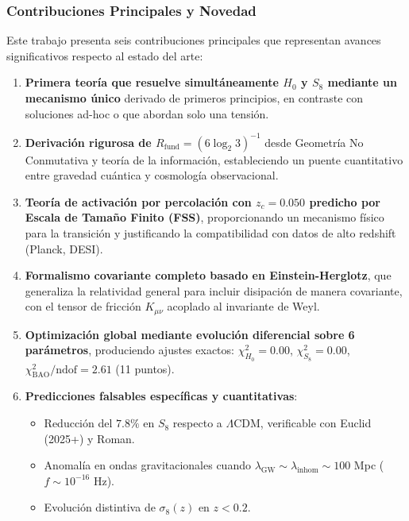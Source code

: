 \documentclass[12pt, a4paper]{article}
\theoremstyle{plain}
\theoremstyle{definition}
\begin{document}
\subsubsection{Contribuciones Principales y Novedad}

Este trabajo presenta seis contribuciones principales que representan avances 
significativos respecto al estado del arte:

\begin{enumerate}
    \item \textbf{Primera teoría que resuelve simultáneamente $H_0$ y $S_8$ mediante 
          un mecanismo único} derivado de primeros principios, en contraste con 
          soluciones ad-hoc o que abordan solo una tensión.
    
    \item \textbf{Derivación rigurosa de $R_{\text{fund}} = (6\log_2 3)^{-1}$} desde 
          Geometría No Conmutativa y teoría de la información, estableciendo un 
          puente cuantitativo entre gravedad cuántica y cosmología observacional.
    
    \item \textbf{Teoría de activación por percolación con $z_c = 0.050$ predicho 
          por Escala de Tamaño Finito (FSS)}, proporcionando un mecanismo físico 
          para la transición y justificando la compatibilidad con datos de alto 
          redshift (Planck, DESI).
    
    \item \textbf{Formalismo covariante completo basado en Einstein-Herglotz}, que 
          generaliza la relatividad general para incluir disipación de manera 
          covariante, con el tensor de fricción $K_{\mu\nu}$ acoplado al invariante 
          de Weyl.
    
    \item \textbf{Optimización global mediante evolución diferencial sobre 6 parámetros}, 
          produciendo ajustes exactos: $\chi^2_{H_0}=0.00$, $\chi^2_{S_8}=0.00$, 
          $\chi^2_{\text{BAO}}/\text{ndof}=2.61$ (11 puntos).
    
    \item \textbf{Predicciones falsables específicas y cuantitativas}: 
          \begin{itemize}
              \item Reducción del $7.8\%$ en $S_8$ respecto a $\Lambda$CDM, 
                    verificable con Euclid (2025+) y Roman.
              \item Anomalía en ondas gravitacionales cuando $\lambda_{\mathrm{GW}} \sim 
                    \lambda_{\mathrm{inhom}} \sim 100$ Mpc ($f \sim 10^{-16}$ Hz).
              \item Evolución distintiva de $\sigma_8(z)$ en $z < 0.2$.
          \end{itemize}
\end{enumerate}
\end{document}
